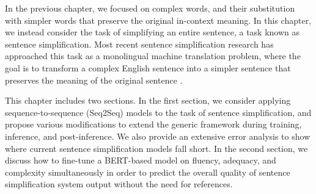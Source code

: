 In the previous chapter, we focused on complex words, and their substitution with simpler words that preserve the original in-context meaning. In this chapter, we instead consider the task of simplifying an entire sentence, a task known as sentence simplification. Most recent sentence simplification research has approached this task as a monolingual machine translation problem, where the goal is to transform a complex English sentence into a simpler sentence that preserves the meaning of the original sentence \citep{zhu2010monolingual,narayan2014hybrid}. 

This chapter includes two sections. In the first section, we consider applying sequence-to-sequence (Seq2Seq) models to the task of sentence simplification, and propose various modifications to extend the generic framework during training, inference, and post-inference. We also provide an extensive error analysis to show where current sentence simplification models fall short. In the second section, we discuss how to fine-tune a BERT-based model on fluency, adequacy, and complexity simultaneously in order to predict the overall quality of sentence simplification system output without the need for references.